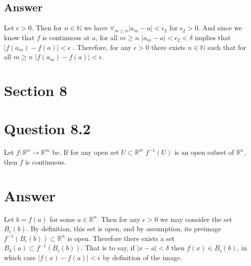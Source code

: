 \documentclass[
	12pt, %
]{fphw}
\begin{document}
\subsection*{Answer}
Let $\epsilon>0$. Then for $n \in \mathbb{N}$ we have $\forall_{m\geq n} |a_m-a|<\epsilon_2$ for $\epsilon_2>0$. And since we know that $f$ is continuous at $a$, for all $m\geq n$ $|a_m-a|<\epsilon_2<\delta$ implies that $|f(a_m)-f(a)|<\epsilon$ . Therefore, for any $\epsilon>0$ there exists $n \in \mathbb{N}$ such that for all $m\geq n$ $|f(a_m)-f(a)|<\epsilon$.  
\section*{Section 8}
\section*{Question 8.2}
\begin{problem}
	Let $f: \mathbb{R}^n \to \mathbb{R}^m$ be. If for any open set $U \subset \mathbb{R^m}$ $f^{-1}(U)$ is an open subset of $\mathbb{R}^n$, then $f$ is continuous. 
\end{problem}
\section*{Answer}
Let $b=f(a)$ for some $a \in \mathbb{R}^n$. Then for any $\epsilon > 0$ we may consider the set $B_{\epsilon}(b)$. By definition, this set is open, and by assumption, its preimage $f^{-1}(B_{\epsilon}(b)) \subset \mathbb{R}^n$ is open. Therefore there exists a set $B_{\delta}(a) \subset f^{-1}(B_{\epsilon}(b))$. That is to say, if $|x-a|<\delta$ then $f(x)\in B_{\epsilon}(b)$, in which case $|f(x)-f(a)|<\epsilon$ by definition of the image.   
\end{document}
